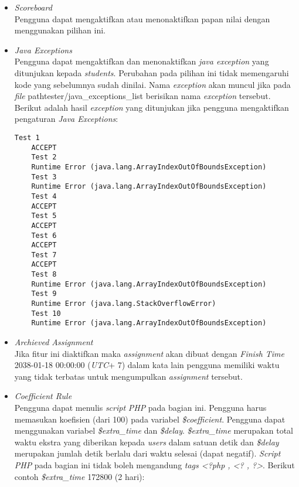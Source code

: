 \begin{itemize}
	\item \textit{Scoreboard} \\
	Pengguna dapat mengaktifkan atau menonaktifkan papan nilai dengan menggunakan pilihan ini.
	
	\item \textit{Java Exceptions} \\
	Pengguna dapat mengaktifkan dan menonaktifkan \textit{java exception} yang ditunjukan kepada \textit{students}. Perubahan pada pilihan ini tidak memengaruhi kode yang sebelumnya sudah dinilai. Nama \textit{exception} akan muncul jika pada \textit{file} path{tester/java\_exceptions\_list} berisikan nama \textit{exception} tersebut. Berikut adalah hasil \textit{exception} yang ditunjukan jika pengguna mengaktifkan pengaturan \textit{Java Exceptions}: \\
	
	\begin{lstlisting}[basicstyle=\ttfamily, frame=single,
	columns=fullflexible, keepspaces=true, breaklines=true, label=ls:6]
	Test 1
	ACCEPT
	Test 2
	Runtime Error (java.lang.ArrayIndexOutOfBoundsException)
	Test 3
	Runtime Error (java.lang.ArrayIndexOutOfBoundsException)
	Test 4
	ACCEPT
	Test 5
	ACCEPT
	Test 6
	ACCEPT
	Test 7
	ACCEPT
	Test 8
	Runtime Error (java.lang.ArrayIndexOutOfBoundsException)
	Test 9
	Runtime Error (java.lang.StackOverflowError)
	Test 10
	Runtime Error (java.lang.ArrayIndexOutOfBoundsException)
	\end{lstlisting}
	
	\item \textit{Archieved Assignment} \\
	Jika fitur ini diaktifkan maka \textit{assignment} akan dibuat dengan \textit{Finish Time} 2038-01-18 00:00:00 (\textit{UTC}+ 7) dalam kata lain pengguna memiliki waktu yang tidak terbatas untuk mengumpulkan \textit{assignment} tersebut.
	
	\item \textit{Coefficient Rule} \\
	Pengguna dapat menulis \textit{script} \textit{PHP} pada bagian ini. Pengguna harus memasukan koefisien (dari 100) pada variabel \textit{\$coefficient}. Pengguna dapat menggunakan variabel \textit{\$extra\_time} dan \textit{\$delay}. \textit{\$extra\_time} merupakan total waktu ekstra yang diberikan kepada \textit{users} dalam satuan detik dan \textit{\$delay} merupakan jumlah detik berlalu dari waktu selesai (dapat negatif). \textit{Script} \textit{PHP} pada bagian ini tidak boleh mengandung \textit{tags <?php , <? , ?>}. Berikut contoh \textit{\$extra\_time} 172800 (2 hari):
	

\end{itemize}
